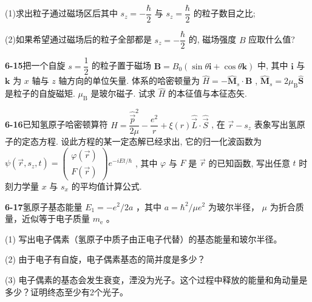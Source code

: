 (1)求出粒子通过磁场区后其中 $\displaystyle s_z = -\dfrac{\hbar}{2}$ 与 $\displaystyle s_z = \dfrac{\hbar}{2}$ 的粒子数目之比;

(2)如果希望通过磁场后的粒子全部都是 $\displaystyle s_z = -\dfrac{\hbar}{2}$ 的, 磁场强度 $\displaystyle B$ 应取什么值?

\vfill

\newpage

\textbf{6-15}\quad 把一个自旋 $\displaystyle s = \dfrac{1}{2}$ 的粒子置于磁场 $\displaystyle \pmb{B} = B_0(\sin \theta \mathbf{i} + \cos \theta \mathbf{k})$ 中, 其中 $\displaystyle \pmb{i}$ 与 $\displaystyle \pmb{k}$ 为 $\displaystyle x$ 轴与 $\displaystyle z$ 轴方向的单位矢量. 体系的哈密顿量为 $\displaystyle \hat{H} = -\hat{\pmb{M}}_s \cdot \pmb{B}$ , $\displaystyle \hat{\pmb{M}}_s = 2\mu_{\mathrm{B}}\hat{\pmb{S}}$ 是粒子的自旋磁矩. $\displaystyle \mu_{\mathrm{B}}$ 是玻尔磁子. 试求 $\displaystyle \hat{H}$ 的本征值与本征态矢.

\vfill

\newpage

\textbf{6-16}\quad 已知氢原子哈密顿算符 $\displaystyle \hat{H} = \dfrac{\hat{\vec{p}}^{2}}{2\mu} - \dfrac{e^2}{r} + \xi(r)\hat{\vec{L}} \cdot \hat{\vec{S}}$ , 在 $\displaystyle \vec{r} - s_z$ 表象写出氢原子的定态方程. 设此方程的某一定态解已经求出, 它的归一化波函数为 $\displaystyle \psi(\vec{r}, s_z, t) = \begin{pmatrix} \varphi(\vec{r}) \\ F(\vec{r}) \end{pmatrix} e^{-iEt/\hbar}$ , 其中 $\displaystyle \varphi$ 与 $\displaystyle F$ 是 $\displaystyle \vec{r}$ 的已知函数, 写出任意 $\displaystyle t$ 时刻力学量 $\displaystyle x$ 与 $\displaystyle s_x$ 的平均值计算公式.

\vfill

\newpage

\textbf{6-17}\quad 氢原子基态能量 $\displaystyle E_{1} = -e^{2} / 2a$ ，其中 $\displaystyle a = \hbar^{2} / \mu e^{2}$ 为玻尔半径， $\displaystyle \mu$ 为折合质量，近似等于电子质量 $\displaystyle m_{\mathrm{e}}$ 。

(1) 写出电子偶素（氢原子中质子由正电子代替）的基态能量和玻尔半径。

(2) 由于电子有自旋，电子偶素基态的简并度是多少？

(3) 电子偶素的基态会发生衰变，湮没为光子。这个过程中释放的能量和角动量是多少？证明终态至少有2个光子。

\vfill

\newpage

